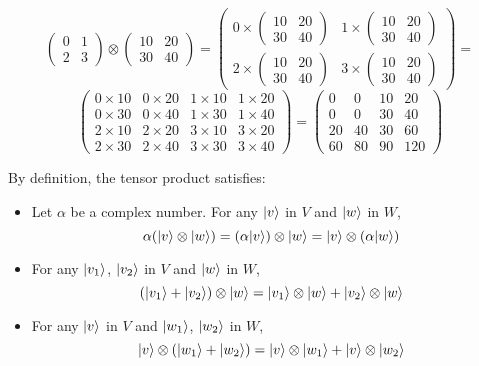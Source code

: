 $$ \begin{pmatrix}
	0 & 1 \\
	2 & 3
\end{pmatrix} \otimes
\begin{pmatrix}
	10 & 20 \\
	30 & 40
\end{pmatrix} =
\begin{pmatrix}
	0 \times \begin{pmatrix} 10 & 20 \\ 30 & 40 \end{pmatrix} &
	1 \times \begin{pmatrix} 10 & 20 \\ 30 & 40 \end{pmatrix} \\
	2 \times \begin{pmatrix} 10 & 20 \\ 30 & 40 \end{pmatrix} &
	3 \times \begin{pmatrix} 10 & 20 \\ 30 & 40 \end{pmatrix}
\end{pmatrix} = 
$$
$$ 
\begin{pmatrix}
	0 \times 10 & 0 \times 20 & 1 \times 10 & 1 \times 20 \\
	0 \times 30 & 0 \times 40 & 1 \times 30 & 1 \times 40 \\
	2 \times 10 & 2 \times 20 & 3 \times 10 & 3 \times 20 \\
	2 \times 30 & 2 \times 40 & 3 \times 30 & 3 \times 40
\end{pmatrix} = 
\begin{pmatrix}
	0 & 0 & 10 & 20 \\
	0 & 0 & 30 & 40 \\
	20 & 40 & 30 & 60 \\
	60 & 80 & 90 & 120
\end{pmatrix}
$$

By definition, the tensor product satisfies:

\begin{itemize}
	\item Let $\alpha$ be a complex number. For any $|v\rangle$ in $V$ and $|w\rangle$ in $W$,
	$$ \alpha(|v\rangle \otimes |w\rangle) = (\alpha|v\rangle) \otimes |w\rangle = |v\rangle \otimes (\alpha|w\rangle) $$
	
	\item For any $|v_1\rangle$, $|v_2\rangle$ in $V$ and $|w\rangle$ in $W$,
	$$ (|v_1\rangle + |v_2\rangle) \otimes |w\rangle = |v_1\rangle \otimes |w\rangle + |v_2\rangle \otimes |w\rangle $$
	
	\item For any $|v\rangle$ in $V$ and $|w_1\rangle$, $|w_2\rangle$ in $W$,
	$$ |v\rangle \otimes (|w_1\rangle + |w_2\rangle) = |v\rangle \otimes |w_1\rangle + |v\rangle \otimes |w_2\rangle $$
\end{itemize}

